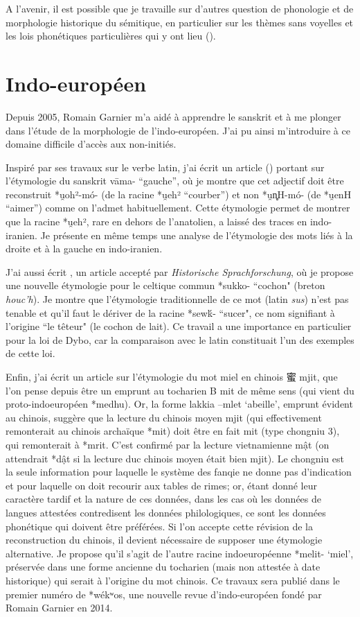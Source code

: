 \documentclass[oldfontcommands,oneside,a4paper,11pt]{memoir}
\newcommand{\ipa}[1]{{\phon #1}} %
\newcommand{\zh}[1]{{\cn #1}}
\begin{document}
A l'avenir, il est possible que je travaille sur d'autres question de phonologie et de morphologie historique du sémitique, en particulier sur les thèmes sans voyelles et les lois phonétiques particulières qui y ont lieu (\citealt{testen85rn}).

\section{Indo-européen}
Depuis 2005, Romain Garnier m'a aidé à apprendre le sanskrit et à me plonger dans l'étude de la morphologie de l'indo-européen. J'ai pu ainsi m'introduire à ce domaine difficile d'accès aux non-initiés.

Inspiré par ses travaux  sur le verbe latin, j'ai écrit un article (\citealt{jacques13vama}) portant sur l'étymologie du sanskrit \ipa{vāma-} ``gauche'', où je montre que cet adjectif doit être reconstruit *u̯oh²-mó- (de la racine *u̯eh² ``courber'') et non *u̯n̻H-mó- (de *u̯enH ``aimer'') comme on l'admet habituellement. Cette étymologie permet de montrer que la racine *u̯eh², rare en dehors de l'anatolien, a laissé des traces en indo-iranien. Je présente en même temps une analyse de l'étymologie des mots liés à la droite et à la gauche en indo-iranien. 

J'ai aussi écrit \citet{jacques14cochon}, un article accepté par \textit{Historische Sprachforschung}, où je propose une nouvelle étymologie pour le celtique commun *sukko- ``cochon" (breton \textit{houc'h}). Je montre que l'étymologie traditionnelle de ce mot (latin \textit{sus}) n'est pas tenable et qu'il faut le dériver de la racine *sewḱ- ``sucer", ce nom signifiant à l'origine ``le têteur" (le cochon de lait). Ce travail a une importance en particulier pour la loi de Dybo, car la comparaison avec le latin constituait l'un des exemples de cette loi.

Enfin, j'ai écrit un article sur l'étymologie du mot miel en chinois \zh{蜜} mjit, que l'on pense depuis \citealt{polivanov16mit} être un emprunt au tocharien B \ipa{mit} de même sens (qui vient du proto-indoeuropéen *medhu). Or, la forme lakkia \ipa{--mlet} `abeille', emprunt évident au chinois, suggère que la lecture du chinois moyen \ipa{mjit} (qui effectivement remonterait au chinois archaïque *mit) doit être en fait \ipa{mit} (type chongniu 3), qui remonterait à *mrit. C'est confirmé par la lecture vietnamienne \ipa{mật} (on attendrait *dật si la lecture duc chinois moyen était bien \ipa{mjit}). Le chongniu est la seule information pour laquelle le système des fanqie ne donne pas d'indication et pour laquelle on doit recourir aux tables de rimes; or, étant donné leur caractère tardif et la nature de ces données, dans les cas où les données de langues attestées contredisent les données philologiques, ce sont les données phonétique qui doivent être préférées. Si l'on accepte cette révision de la reconstruction du chinois, il devient nécessaire de supposer une étymologie alternative. Je propose qu'il s'agit de l'autre racine indoeuropéenne *melit- `miel', préservée dans une forme ancienne du tocharien (mais non attestée à date historique) qui serait à l'origine du mot chinois. Ce travaux sera publié dans le premier numéro de *wékʷos, une nouvelle revue d'indo-européen fondé par Romain Garnier en 2014.
\end{document}
